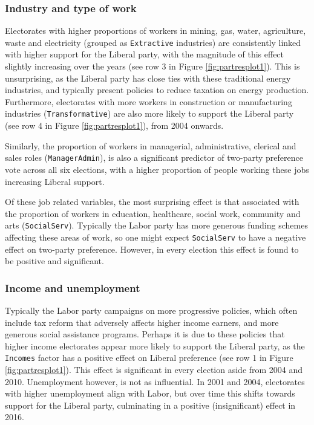 \documentclass[times, doublespace]{anzsauth}
\begin{document}
\hypertarget{industry-and-type-of-work}{%
\subsubsection*{Industry and type of work}\label{industry-and-type-of-work}}

Electorates with higher proportions of workers in mining, gas, water, agriculture, waste and electricity (grouped as \texttt{Extractive} industries) are consistently linked with higher support for the Liberal party, with the magnitude of this effect slightly increasing over the years (see row 3 in Figure \ref{fig:partresplot1}). This is unsurprising, as the Liberal party has close ties with these traditional energy industries, and typically present policies to reduce taxation on energy production. Furthermore, electorates with more workers in construction or manufacturing industries (\texttt{Transformative}) are also more likely to support the Liberal party (see row 4 in Figure \ref{fig:partresplot1}), from 2004 onwards.

Similarly, the proportion of workers in managerial, administrative, clerical and sales roles (\texttt{ManagerAdmin}), is also a significant predictor of two-party preference vote across all six elections, with a higher proportion of people working these jobs increasing Liberal support.

Of these job related variables, the most surprising effect is that associated with the proportion of workers in education, healthcare, social work, community and arts (\texttt{SocialServ}). Typically the Labor party has more generous funding schemes affecting these areas of work, so one might expect \texttt{SocialServ} to have a negative effect on two-party preference. However, in every election this effect is found to be positive and significant.

\hypertarget{income-and-unemployment}{%
\subsubsection*{Income and unemployment}\label{income-and-unemployment}}

Typically the Labor party campaigns on more progressive policies, which often include tax reform that adversely affects higher income earners, and more generous social assistance programs. Perhaps it is due to these policies that higher income electorates appear more likely to support the Liberal party, as the \texttt{Incomes} factor has a positive effect on Liberal preference (see row 1 in Figure \ref{fig:partresplot1}). This effect is significant in every election aside from 2004 and 2010. Unemployment however, is not as influential. In 2001 and 2004, electorates with higher unemployment align with Labor, but over time this shifts towards support for the Liberal party, culminating in a positive (insignificant) effect in 2016.
\end{document}
